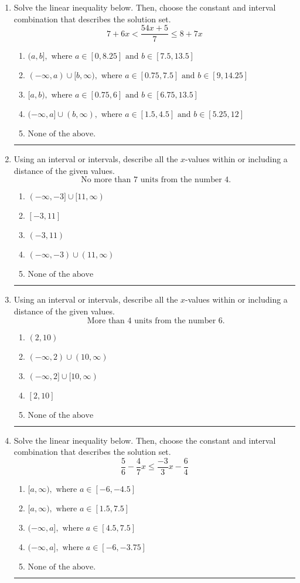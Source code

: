 \documentclass[14pt]{extbook}
\newcommand{\litem}[1]{\item#1\hspace*{-1cm}\rule{\textwidth}{0.4pt}}
\begin{document}
\begin{enumerate}
{\begin{enumerate}[label=\Alph*.]
\end{enumerate} }
\litem{
Solve the linear inequality below. Then, choose the constant and interval combination that describes the solution set.\[ 7 + 6 x < \frac{54 x + 5}{7} \leq 8 + 7 x \]\begin{enumerate}[label=\Alph*.]
\item \( (a, b], \text{ where } a \in [0, 8.25] \text{ and } b \in [7.5, 13.5] \)
\item \( (-\infty, a) \cup [b, \infty), \text{ where } a \in [0.75, 7.5] \text{ and } b \in [9, 14.25] \)
\item \( [a, b), \text{ where } a \in [0.75, 6] \text{ and } b \in [6.75, 13.5] \)
\item \( (-\infty, a] \cup (b, \infty), \text{ where } a \in [1.5, 4.5] \text{ and } b \in [5.25, 12] \)
\item \( \text{None of the above.} \)

\end{enumerate} }
\litem{
Using an interval or intervals, describe all the $x$-values within or including a distance of the given values.\[ \text{ No more than } 7 \text{ units from the number } 4. \]\begin{enumerate}[label=\Alph*.]
\item \( (-\infty, -3] \cup [11, \infty) \)
\item \( [-3, 11] \)
\item \( (-3, 11) \)
\item \( (-\infty, -3) \cup (11, \infty) \)
\item \( \text{None of the above} \)

\end{enumerate} }
\litem{
Using an interval or intervals, describe all the $x$-values within or including a distance of the given values.\[ \text{ More than } 4 \text{ units from the number } 6. \]\begin{enumerate}[label=\Alph*.]
\item \( (2, 10) \)
\item \( (-\infty, 2) \cup (10, \infty) \)
\item \( (-\infty, 2] \cup [10, \infty) \)
\item \( [2, 10] \)
\item \( \text{None of the above} \)

\end{enumerate} }
\litem{
Solve the linear inequality below. Then, choose the constant and interval combination that describes the solution set.\[ \frac{5}{6} - \frac{4}{7} x \leq \frac{-3}{3} x - \frac{6}{4} \]\begin{enumerate}[label=\Alph*.]
\item \( [a, \infty), \text{ where } a \in [-6, -4.5] \)
\item \( [a, \infty), \text{ where } a \in [1.5, 7.5] \)
\item \( (-\infty, a], \text{ where } a \in [4.5, 7.5] \)
\item \( (-\infty, a], \text{ where } a \in [-6, -3.75] \)
\item \( \text{None of the above}. \)


\end{enumerate}}
\end{enumerate}
\end{document}
